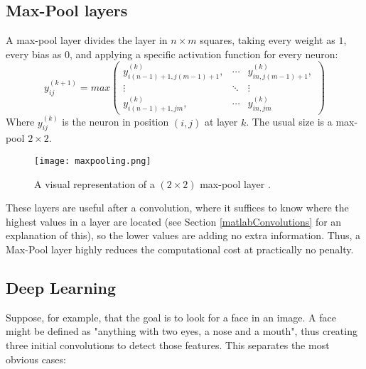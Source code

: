 \documentclass[titlepage]{article}
\theoremstyle{plain}
\theoremstyle{definition}
\begin{document}
		\subsection{Max-Pool layers}
		
		A max-pool layer divides the layer in $n\times m$ squares, taking every weight as $1$, every bias as $0$, and applying a specific activation function for every neuron:
		$$
			y_{ij}^{(k+1)} = max
			\begin{pmatrix}
				y_{i(n-1)+1,j(m-1)+1}^{(k)},	& \cdots	& y_{in,j(m-1)+1}^{(k)},	\\
				\vdots							& \ddots	& \vdots					\\
				y_{i(n-1)+1,jm}^{(k)},			& \cdots	& y_{in,jm}^{(k)}
			\end{pmatrix}
		$$
		Where $y_{ij}^{(k)}$ is the neuron in position $(i,j)$ at layer $k$. The usual size is a max-pool $2\times2$.
		\begin{figure}[H]
			\centering
			\texttt{[image: maxpooling.png]}
			\caption{A visual representation of a $(2\times2)$ max-pool layer \cite{Nielsen}.}
			\label{fig:maxpooling}
		\end{figure}
		These layers are useful after a convolution, where it suffices to know where the highest values in a layer are located (see Section \ref{matlabConvolutions} for an explanation of this), so the lower values are adding no extra information. Thus, a Max-Pool layer highly reduces the computational cost at practically no penalty.
		
		\subsection{Deep Learning}
		
		Suppose, for example, that the goal is to look for a face in an image. A face might be defined as "anything with two eyes, a nose and a mouth", thus creating three initial convolutions to detect those features. This separates the most obvious cases:
	
\end{document}
